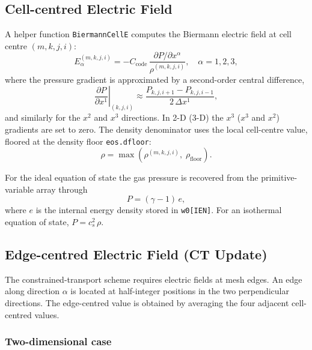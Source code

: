 \documentclass[11pt]{article}
\begin{document}
\subsection{Cell-centred Electric Field}

A helper function \texttt{BiermannCellE} computes the Biermann electric field
at cell centre $(m,k,j,i)$:
\begin{equation}
  E_{\alpha}^{(m,k,j,i)}
    = -C_\mathrm{code}\,
      \frac{\partial P/\partial x^\alpha}{\rho^{(m,k,j,i)}},
  \quad \alpha = 1,2,3,
  \label{eq:cell_e}
\end{equation}
where the pressure gradient is approximated by a second-order central
difference,
\begin{equation}
  \left.\frac{\partial P}{\partial x^1}\right|_{(k,j,i)}
    \approx \frac{P_{k,j,i+1} - P_{k,j,i-1}}{2\,\Delta x^1},
  \label{eq:grad_p}
\end{equation}
and similarly for the $x^2$ and $x^3$ directions.  In 2-D (3-D) the $x^3$
($x^3$ and $x^2$) gradients are set to zero.  The density denominator uses the
local cell-centre value, floored at the density floor \texttt{eos.dfloor}:
\begin{equation}
  \rho = \max\!\left(\rho^{(m,k,j,i)},\; \rho_\mathrm{floor}\right).
\end{equation}

For the ideal equation of state the gas pressure is recovered from the
primitive-variable array through
\begin{equation}
  P = (\gamma-1)\,e,
\end{equation}
where $e$ is the internal energy density stored in \texttt{w0[IEN]}.
For an isothermal equation of state, $P = c_s^2\,\rho$.

\subsection{Edge-centred Electric Field (CT Update)}
\label{sec:edge_e}

The constrained-transport scheme requires electric fields at mesh edges.
An edge along direction $\alpha$ is located at half-integer positions in the
two perpendicular directions.  The edge-centred value is obtained by averaging
the four adjacent cell-centred values.

\subsubsection{Two-dimensional case}
\end{document}
